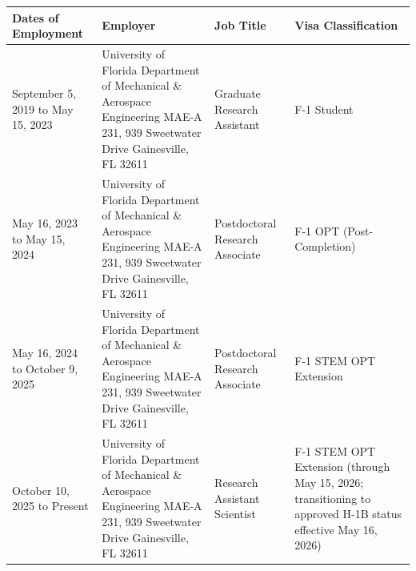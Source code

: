 \documentclass[11pt, letterpaper]{article}
\begin{document}
\renewcommand{\arraystretch}{1.6}
\begin{tabularx}{\textwidth}{|>{\raggedright\arraybackslash}p{3.2cm}|>{\raggedright\arraybackslash}X|>{\raggedright\arraybackslash}p{3.5cm}|>{\raggedright\arraybackslash}p{2.8cm}|}
\hline
\textbf{Dates of Employment} & \textbf{Employer} & \textbf{Job Title} & \textbf{Visa Classification} \\
\hline

September 5, 2019 \newline to \newline May 15, 2023
&
University of Florida \newline
Department of Mechanical \& Aerospace Engineering \newline
MAE-A 231, 939 Sweetwater Drive \newline
Gainesville, FL 32611
&
Graduate Research Assistant
&
F-1 Student
\\
\hline

May 16, 2023 \newline to \newline May 15, 2024
&
University of Florida \newline
Department of Mechanical \& Aerospace Engineering \newline
MAE-A 231, 939 Sweetwater Drive \newline
Gainesville, FL 32611
&
Postdoctoral Research Associate
&
F-1 OPT \newline
(Post-Completion)
\\
\hline

May 16, 2024 \newline to \newline October 9, 2025
&
University of Florida \newline
Department of Mechanical \& Aerospace Engineering \newline
MAE-A 231, 939 Sweetwater Drive \newline
Gainesville, FL 32611
&
Postdoctoral Research Associate
&
F-1 STEM OPT \newline
Extension
\\
\hline

October 10, 2025 \newline to \newline Present
&
University of Florida \newline
Department of Mechanical \& Aerospace Engineering \newline
MAE-A 231, 939 Sweetwater Drive \newline
Gainesville, FL 32611
&
Research Assistant Scientist
&
F-1 STEM OPT \newline
Extension \newline
(through May 15, 2026; \newline
transitioning to approved \newline
H-1B status effective \newline
May 16, 2026)
\\
\hline
\end{tabularx}
\end{document}
